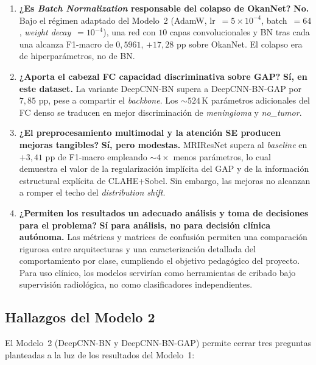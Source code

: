\begin{enumerate}
  \item \textbf{¿Es \textit{Batch Normalization} responsable
        del colapso de OkanNet?} \textbf{No.} Bajo el régimen
        adaptado del Modelo~2 (AdamW, lr~$=5{\times}10^{-4}$,
        batch~$=64$, \textit{weight decay}~$=10^{-4}$), una red
        con $10$ capas convolucionales y BN tras cada una
        alcanza F1-macro de $0{,}5961$, $+17{,}28$ pp sobre
        OkanNet. El colapso era de hiperparámetros, no de BN.

  \item \textbf{¿Aporta el cabezal FC capacidad discriminativa
        sobre GAP?} \textbf{Sí, en este dataset.} La variante
        DeepCNN-BN supera a DeepCNN-BN-GAP por $7{,}85$ pp,
        pese a compartir el \textit{backbone}. Los $\sim 524$\,K
        parámetros adicionales del FC denso se traducen en
        mejor discriminación de \textit{meningioma} y
        \textit{no\_tumor}.

  \item \textbf{¿El preprocesamiento multimodal y la atención
        SE producen mejoras tangibles?} \textbf{Sí, pero
        modestas.} MRIResNet supera al \textit{baseline} en
        $+3{,}41$ pp de F1-macro empleando $\sim 4{\times}$
        menos parámetros, lo cual demuestra el valor de la
        regularización implícita del GAP y de la información
        estructural explícita de CLAHE+Sobel. Sin embargo, las
        mejoras no alcanzan a romper el techo del
        \textit{distribution shift}.

  \item \textbf{¿Permiten los resultados un adecuado análisis
        y toma de decisiones para el problema?} \textbf{Sí
        para análisis, no para decisión clínica autónoma.}
        Las métricas y matrices de confusión permiten una
        comparación rigurosa entre arquitecturas y una
        caracterización detallada del comportamiento por clase,
        cumpliendo el objetivo pedagógico del proyecto. Para
        uso clínico, los modelos servirían como herramientas
        de cribado bajo supervisión radiológica, no como
        clasificadores independientes.
\end{enumerate}

\subsection*{Hallazgos del Modelo 2}

El Modelo~2 (DeepCNN-BN y DeepCNN-BN-GAP) permite cerrar tres
preguntas planteadas a la luz de los resultados del Modelo~1:

